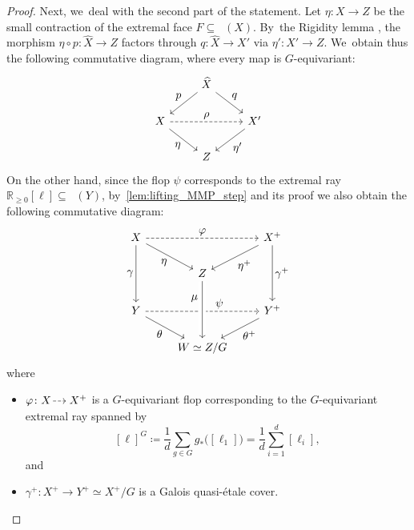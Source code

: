 \documentclass[JEP,XML,SOM,Unicode,published]{cedram}
\let\ts\textstyle
\newcommand{\dradpl}{{\hspace*{-2.5mm}\begin{tikzcd}[ampersand replacement=\&,column sep = scriptsize]\mbox{}\ar[r,dashed]\&\mbox{}\end{tikzcd}\hspace*{-2.5mm}}}
\newcommand{\dratst}{{\hspace*{-2.5mm}\begin{tikzcd}[ampersand replacement=\&,column sep = small]\mbox{}\ar[r,dashed]\&\mbox{}\end{tikzcd}\hspace*{-2mm}}}
\let\drascst\dratst
\newcommand{\dra}{\mathchoice{\dradpl}{\dratst}{\drascst}{\drascst}}
\theoremstyle{plain}
\theoremstyle{definition}
\newcommand{\R}{\mathbb{R}}
\DeclareMathOperator{\NEb}{\overline{\mathrm{NE}}}
\begin{document}
\begin{proof}
Next, we~deal with the second part of the statement. Let $\eta \colon X \to Z$ be the small contraction of the extremal face $F \subseteq \NEb(X)$. By~the Rigidity lemma \cite[Prop.\,1.14]{Debarre01book}, the morphism $\eta\circ p\colon \widehat{X}\to Z$ factors through $q \colon \widehat{X} \to X'$ via $\eta' \colon X' \to Z$. We~obtain thus the following commutative diagram, where every map is $G$\nobreakdash-equivariant:\vspace*{-3pt}
\[
\begin{tikzcd}
& \widehat{X} \arrow[ld, "\ts p" swap] \arrow[rd, "\ts q"] \\
X \arrow[rd, "\ts \eta"'] \arrow[rr, "\ts \rho", dashed] & & X' \arrow[ld, "\ts \eta'"] \\
& Z
\end{tikzcd}
\]
On the other hand, since the flop $\psi$ corresponds to the extremal ray $\R_{\geq 0} [\ell] \subseteq \NEb(Y)$, by~\autoref{lem:lifting_MMP_step} and its proof we also obtain the following commutative diagram:\vspace*{-1pt}
\[
\begin{tikzcd}
X \arrow[dd, "\ts \gamma"'] \arrow[rd, "\ts \eta"'] \arrow[rr, "\ts \varphi", dashed] & & X^+ \arrow[dd, "\ts \gamma^+"] \arrow[ld, "\ts \eta^+"] \\
& Z \arrow[dd, "\ts \mu\,", pos=0.3, swap] \\
Y \arrow[rd, "\ts \theta"'] \arrow[rr, "\ts \psi", pos=0.65, dashed] & & Y^+ \arrow[ld, "\ts \theta^+"] \\
& W \simeq Z/G\arrow[uu,leftarrow, crossing over]
\end{tikzcd}
\]
where
\begin{itemize}
\item
$\varphi \colon X \dra X^+$ is a $G$\nobreakdash-equivariant flop corresponding to the $G$\nobreakdash-equivariant extremal ray spanned by\vspace*{-5pt}
\[
[\ell]^G \coloneqq \frac{1}{d} \sum_{g\in G} g_* \bigl([\ell_1] \bigr) = \frac{1}{d}\sum_{i=1}^d [\ell_i],
\]
and

\item
$\gamma^+\colon X^+\to Y^+\simeq X^+/G$ is a Galois quasi-étale cover.
\end{itemize}


\end{proof}
\end{document}
